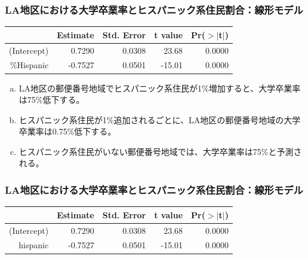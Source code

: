 
\begin{frame}
\frametitle{LA地区における大学卒業率とヒスパニック系住民割合：線形モデル}


{\small
\begin{center}
\begin{tabular}{rrrrr}
  \hline
 & Estimate & Std. Error & t value & Pr($>$$|$t$|$) \\
  \hline
(Intercept) & 0.7290 & 0.0308 & 23.68 & 0.0000 \\
 \%Hispanic & -0.7527 & 0.0501 & -15.01 & 0.0000 \\
   \hline
\end{tabular}
\end{center}
}

\begin{enumerate}[(a)]
\item LA地区の郵便番号地域でヒスパニック系住民が1\%増加すると、大学卒業率は75\%低下する。
\item ヒスパニック系住民が1\%追加されるごとに、LA地区の郵便番号地域の大学卒業率は0.75\%低下する。
\item ヒスパニック系住民がいない郵便番号地域では、大学卒業率は75\%と予測される。
\end{enumerate}

\end{frame}


\begin{frame}
\frametitle{LA地区における大学卒業率とヒスパニック系住民割合：線形モデル}


{\small
\begin{center}
\begin{tabular}{rrrrr}
  \hline
 & Estimate & Std. Error & t value & Pr($>$$|$t$|$) \\
  \hline
(Intercept) & 0.7290 & 0.0308 & 23.68 & 0.0000 \\
  hispanic & -0.7527 & 0.0501 & -15.01 & 0.0000 \\
   \hline
\end{tabular}
\end{center}
}

$\:$ \\


\end{frame}

